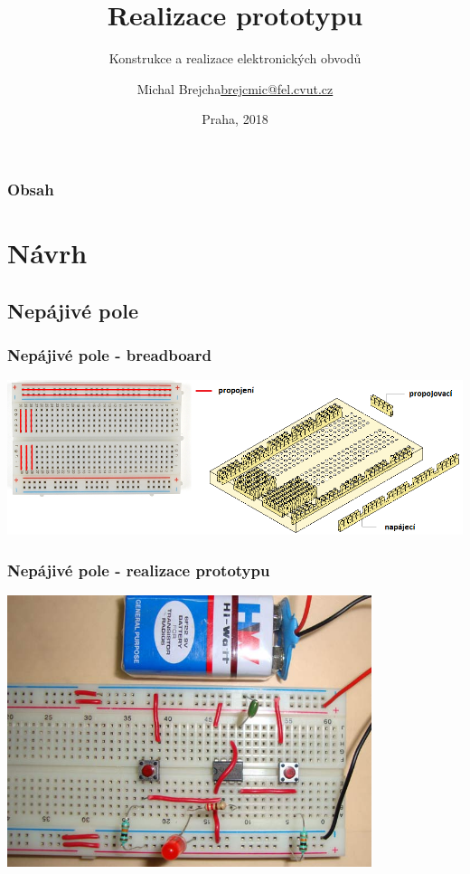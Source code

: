 \documentclass{beamer}
\title[Realizace prototypu]{Realizace prototypu}
\subtitle[KEO] {Konstrukce a realizace elektronických obvodů}
\author[Brejcha]{\texorpdfstring{Michal Brejcha\newline\url{brejcmic@fel.cvut.cz}}{Michal Brejcha}}
\institute[CVUT]{ČVUT v Praze, FEL}
\date[Praha, 2018]{Praha, 2018}
\begin{document}
\frame{\titlepage}

\begin{frame}
\frametitle{Obsah} 
\tableofcontents
\end{frame}


\section{\texorpdfstring{Návrh}{Navrh}}
\subsection{\texorpdfstring{Nepájivé pole}{Nepajive pole}}
  \begin{frame}
    \frametitle{Nepájivé pole - breadboard}
    \begin{center}
      \includegraphics[width=\textwidth]{obr/breadBoard_bot.png}
    \end{center}
  \end{frame}
  \begin{frame}
    \frametitle{Nepájivé pole - realizace prototypu}
    \begin{center}
      \includegraphics[width=0.8\textwidth]{obr/breadBoard_prot.png}
    \end{center}
  \end{frame}
\end{document}
